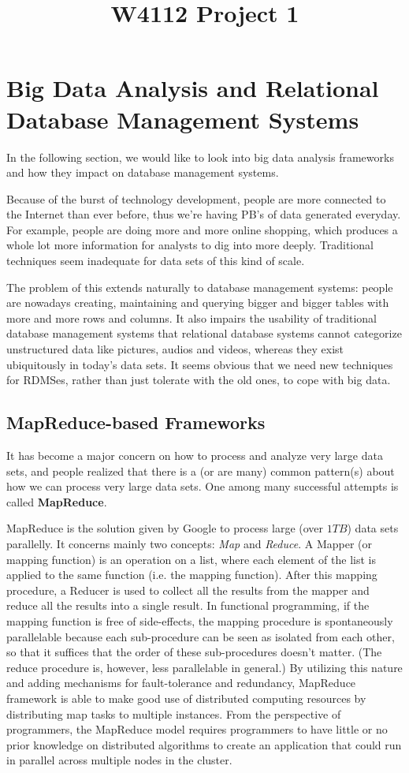 \documentclass{article}
\title{W4112 Project 1}
\begin{document}
\section{Big Data Analysis and Relational Database Management Systems}

In the following section, we would like to look into big data analysis frameworks and how they impact on database management systems.

Because of the burst of technology development, people are more connected to the Internet than ever before, thus we're having PB's of data generated everyday. For example, people are doing more and more online shopping, which produces a whole lot more information for analysts to dig into more deeply. Traditional techniques seem inadequate for data sets of this kind of scale. 

The problem of this extends naturally to database management systems: people are nowadays creating, maintaining and querying bigger and bigger tables with more and more rows and columns. It also impairs the usability of traditional database management systems that relational database systems cannot categorize unstructured data like pictures, audios and videos, whereas they exist ubiquitously in today's data sets.\cite{bigs1} It seems obvious that we need new techniques for RDMSes, rather than just tolerate with the old ones, to cope with big data.

\subsection{MapReduce-based Frameworks}

It has become a major concern on how to process and analyze very large data sets, and people realized that there is a (or are many) common pattern(s) about how we can process very large data sets. One among many successful attempts is called \textbf{MapReduce}.

MapReduce is the solution given by Google to process large (over $1TB$) data sets parallelly. It concerns mainly two concepts: \textit{Map} and \textit{Reduce}. A Mapper (or mapping function) is an operation on a list, where each element of the list is applied to the same function (i.e. the mapping function). After this mapping procedure, a Reducer is used to collect all the results from the mapper and reduce all the results into a single result. In functional programming, if the mapping function is free of side-effects, the mapping procedure is spontaneously parallelable because each sub-procedure can be seen as isolated from each other, so that it suffices that the order of these sub-procedures doesn't matter. (The reduce procedure is, however, less parallelable in general.) By utilizing this nature and adding mechanisms for fault-tolerance and redundancy, MapReduce framework is able to make good use of distributed computing resources by distributing map tasks to multiple instances.\cite{wiki:mapreduce} From the perspective of programmers, the MapReduce model requires programmers to have little or no prior knowledge on distributed algorithms to create an application that could run in parallel across multiple nodes in the cluster.\cite{xie2010improving}
\end{document}
